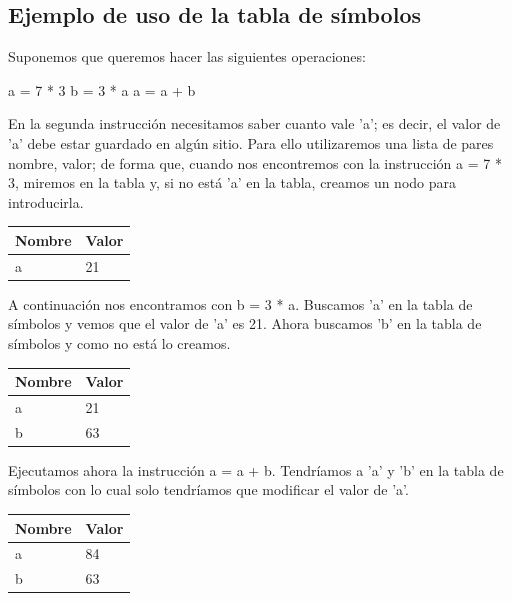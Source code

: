 \documentclass[11pt, english]{article}
\begin{document}
	\subsection{Ejemplo de uso de la tabla de símbolos}
	
	Suponemos que queremos hacer las siguientes operaciones:
	
		a = 7 * 3
		b = 3 * a
		a = a + b
	
	En la segunda instrucción necesitamos saber cuanto vale 'a'; es decir, el valor de 'a' debe estar guardado en algún sitio. Para ello utilizaremos una lista de pares nombre, valor; de forma que, cuando nos encontremos con la instrucción a = 7 * 3, miremos en la tabla y, si no está 'a' en la tabla, creamos un nodo para introducirla.
	\newline
	\begin{table}[H]
		\begin{center}
			\begin{tabular}{l|l}
				\toprule
				\textbf{Nombre} & \textbf{Valor}\\
				\midrule
				a	& 	21\\
				\bottomrule
			\end{tabular}
		\end{center}
	\end{table}
	\newline
	A continuación nos encontramos con b = 3 * a. Buscamos 'a' en la tabla de símbolos y vemos que el valor de 'a' es 21. Ahora buscamos 'b' en la tabla de símbolos y como no está lo creamos.
	\newline
	\begin{table}[H]
		\begin{center}
			\begin{tabular}{l|l}
				\toprule
				\textbf{Nombre} & \textbf{Valor}\\
				\midrule
				a	& 	21\\
				b	&	63\\
				\bottomrule
			\end{tabular}
		\end{center}
	\end{table}
	\newline
	Ejecutamos ahora la instrucción a = a + b. Tendríamos a 'a' y 'b' en la tabla de símbolos con lo cual solo tendríamos que modificar	el valor de 'a'.
	\newline
	\begin{table}[H]
		\begin{center}
			\begin{tabular}{l|l}
				\toprule
				\textbf{Nombre} & \textbf{Valor}\\
				\midrule
				a	& 	84\\
				b	&	63\\
				\bottomrule
			\end{tabular}
		\end{center}
	\end{table}
	\newline
	
\end{document}
